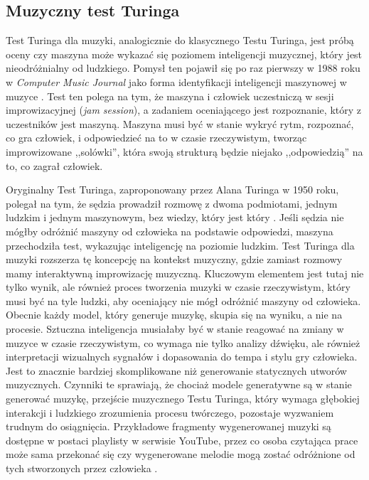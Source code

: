 \documentclass[data-science]{agh-wi} %
\begin{document}
\subsection{Muzyczny test Turinga}
Test Turinga dla muzyki, analogicznie do klasycznego Testu Turinga, jest próbą oceny czy maszyna może wykazać się poziomem inteligencji muzycznej, który jest nieodróżnialny od ludzkiego. Pomysł ten pojawił się po raz pierwszy w 1988 roku w \textit{Computer Music Journal} jako forma identyfikacji inteligencji maszynowej w muzyce \cite{music_turing_test}. Test ten polega na tym, że maszyna i człowiek uczestniczą w sesji improwizacyjnej (\textit{jam session}), a zadaniem oceniającego jest rozpoznanie, który z uczestników jest maszyną. Maszyna musi być w stanie wykryć rytm, rozpoznać, co gra człowiek, i odpowiedzieć na to w czasie rzeczywistym, tworząc improwizowane ,,solówki'', która swoją strukturą będzie niejako ,,odpowiedzią'' na to, co zagrał człowiek.

Oryginalny Test Turinga, zaproponowany przez Alana Turinga w 1950 roku, polegał na tym, że sędzia prowadził rozmowę z dwoma podmiotami, jednym ludzkim i jednym maszynowym, bez wiedzy, który jest który \cite{turing_test}. Jeśli sędzia nie mógłby odróżnić maszyny od człowieka na podstawie odpowiedzi, maszyna przechodziła test, wykazując inteligencję na poziomie ludzkim. Test Turinga dla muzyki rozszerza tę koncepcję na kontekst muzyczny, gdzie zamiast rozmowy mamy interaktywną improwizację muzyczną. Kluczowym elementem jest tutaj nie tylko wynik, ale również proces tworzenia muzyki w czasie rzeczywistym, który musi być na tyle ludzki, aby oceniający nie mógł odróżnić maszyny od człowieka. Obecnie każdy model, który generuje muzykę, skupia się na wyniku, a nie na procesie. Sztuczna inteligencja musiałaby być w stanie reagować na zmiany w muzyce w czasie rzeczywistym, co wymaga nie tylko analizy dźwięku, ale również interpretacji wizualnych sygnałów i dopasowania do tempa i stylu gry człowieka. Jest to znacznie bardziej skomplikowane niż generowanie statycznych utworów muzycznych. Czynniki te sprawiają, że chociaż modele generatywne są w stanie generować muzykę, przejście muzycznego Testu Turinga, który wymaga głębokiej interakcji i ludzkiego zrozumienia procesu twórczego, pozostaje wyzwaniem trudnym do osiągnięcia. Przykładowe fragmenty wygenerowanej muzyki są dostępne w postaci playlisty w serwisie YouTube, przez co osoba czytająca prace może sama przekonać się czy wygenerowane melodie mogą zostać odróżnione od tych stworzonych przez człowieka \cite*{playlist}.
\end{document}
